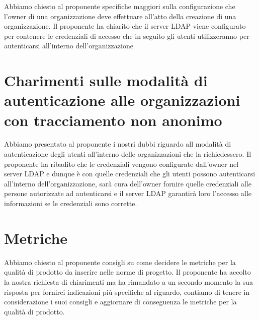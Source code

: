 \documentclass{article}
\begin{document}
Abbiamo chiesto al proponente specifiche maggiori sulla configurazione che l'owner di una organizzazione deve effettuare all'atto della creazione di una organizzazione. Il proponente ha chiarito che il server LDAP viene configurato per contenere le credenziali di accesso che in seguito gli utenti utilizzeranno per autenticarsi all'interno dell'organizzazione

\section{Charimenti sulle modalità di autenticazione alle organizzazioni con tracciamento non anonimo}%
\label{sec:chiarimenti_su_verifica}

Abbiamo presentato al proponente i nostri dubbi riguardo all modalità di autenticazione degli utenti all'interno delle organizzazioni che la richiedessero. Il proponente ha ribadito che le credenziali vengono configurate dall'owner nel server LDAP e dunque è con quelle credenziali che gli utenti possono autenticarsi all'interno dell'organizzazione, sarà cura dell'owner fornire quelle credenziali alle persone autorizzate ad autenticarsi e il server LDAP garantirà loro l'accesso alle informazioni se le credenziali sono corrette.

\section{Metriche}%
\label{sec:metriche}

Abbiamo chiesto al proponente consigli su come decidere le metriche per la qualità di prodotto da inserire nelle norme di progetto. Il proponente ha accolto la nostra richiesta di chiarimenti ma ha rimandato a un secondo momento la sua risposta per fornirci indicazioni più specifiche al riguardo, contiamo di tenere in considerazione i suoi consigli e aggiornare di conseguenza le metriche per la qualità di prodotto.

\newpage
\end{document}
